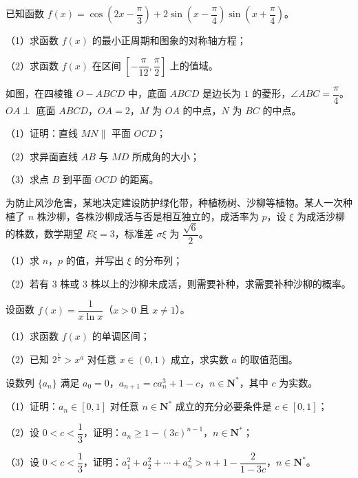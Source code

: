 \begingroup
\renewenvironment{question}{\Needspace{0.46\textheight}}{}
\begin{question}
已知函数 $f(x)=\cos\left(2x-\dfrac{\pi}{3}\right)+2\sin\left(x-\dfrac{\pi}{4}\right)\sin\left(x+\dfrac{\pi}{4}\right)$。

（1）求函数 $f(x)$ 的最小正周期和图象的对称轴方程；

（2）求函数 $f(x)$ 在区间 $\left[-\dfrac{\pi}{12},\dfrac{\pi}{2}\right]$ 上的值域。

\Needspace{0.4\textheight}
\end{question}
\endgroup
\begin{question}
如图，在四棱锥 $O-ABCD$ 中，底面 $ABCD$ 是边长为 $1$ 的菱形，$\angle ABC=\dfrac{\pi}{4}$。$OA\perp$ 底面 $ABCD$，$OA=2$，$M$ 为 $OA$ 的中点，$N$ 为 $BC$ 的中点。

（1）证明：直线 $MN\parallel$ 平面 $OCD$；

（2）求异面直线 $AB$ 与 $MD$ 所成角的大小；

（3）求点 $B$ 到平面 $OCD$ 的距离。
\nopagebreak[4]
\begin{center}\end{center}
\nopagebreak[4]
\end{question}
\begin{question}
为防止风沙危害，某地决定建设防护绿化带，种植杨树、沙柳等植物。某人一次种植了 $n$ 株沙柳，各株沙柳成活与否是相互独立的，成活率为 $p$，设 $\xi$ 为成活沙柳的株数，数学期望 $E\xi=3$，标准差 $\sigma\xi$ 为 $\dfrac{\sqrt6}{2}$。

（1）求 $n$，$p$ 的值，并写出 $\xi$ 的分布列；

（2）若有 $3$ 株或 $3$ 株以上的沙柳未成活，则需要补种，求需要补种沙柳的概率。

\end{question}
\begin{question}
设函数 $f(x)=\dfrac1{x\ln x}$（$x>0$ 且 $x\neq1$）。

（1）求函数 $f(x)$ 的单调区间；

（2）已知 $2^{\frac1x}>x^a$ 对任意 $x\in(0,1)$ 成立，求实数 $a$ 的取值范围。

\end{question}
\begin{question}
设数列 $\{a_n\}$ 满足 $a_0=0$，$a_{n+1}=ca_n^3+1-c$，$n\in\mathbf N^*$，其中 $c$ 为实数。

（1）证明：$a_n\in[0,1]$ 对任意 $n\in\mathbf N^*$ 成立的充分必要条件是 $c\in[0,1]$；

（2）设 $0<c<\dfrac13$，证明：$a_n\geqslant1-(3c)^{n-1}$，$n\in\mathbf N^*$；

（3）设 $0<c<\dfrac13$，证明：$a_1^2+a_2^2+\cdots+a_n^2>n+1-\dfrac{2}{1-3c}$，$n\in\mathbf N^*$。

\end{question}
